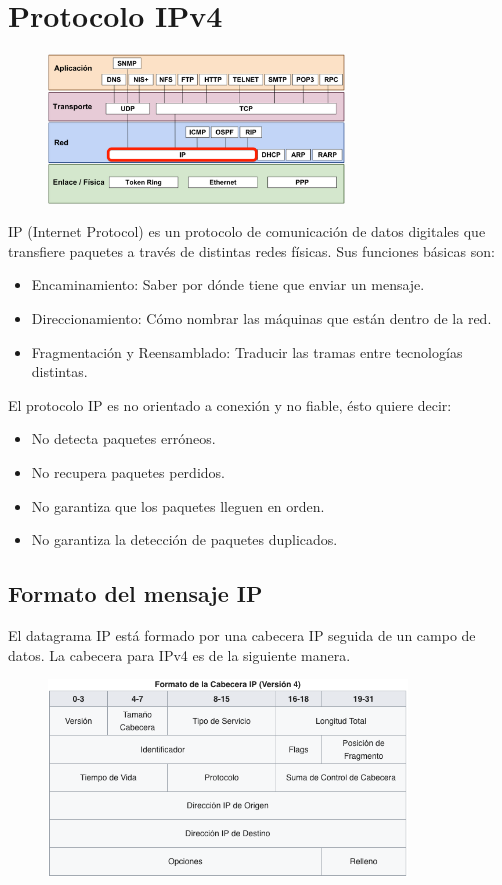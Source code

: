 \section{Protocolo IPv4}
\begin{figure}[H]
    \centering
    \includegraphics[width=0.7\textwidth]{img/IP.png}
\end{figure}
IP (Internet Protocol) es un protocolo de comunicación de datos digitales que transfiere paquetes a través de distintas redes físicas. Sus funciones básicas son:
\begin{itemize}
\item Encaminamiento: Saber por dónde tiene que enviar un mensaje.
\item Direccionamiento: Cómo nombrar las máquinas que están dentro de la red.
\item Fragmentación y Reensamblado: Traducir las tramas entre tecnologías distintas.
\end{itemize}
El protocolo IP es no orientado a conexión y no fiable, ésto quiere decir:
\begin{itemize}
    \item No detecta paquetes erróneos.
    \item No recupera paquetes perdidos.
    \item No garantiza que los paquetes lleguen en orden.
    \item No garantiza la detección de paquetes duplicados.
\end{itemize}
\subsection{Formato del mensaje IP}

El datagrama IP está formado por una cabecera IP seguida de un campo de datos. La cabecera para IPv4 es de la siguiente manera.

\begin{figure}[h]
\centering
\includegraphics[width=0.85\textwidth]{img/datagramaIPv4.png}
\end{figure}

